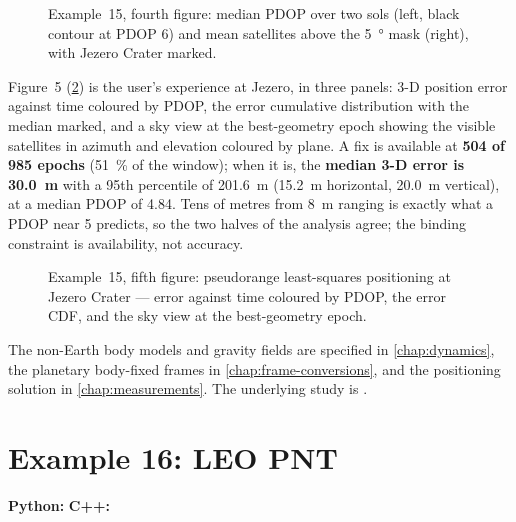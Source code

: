 \begin{figure}[htbp]
  \centering
  \caption{Example~15, fourth figure: median PDOP over two sols (left, black
           contour at PDOP 6) and mean satellites above the \SI{5}{\degree} mask
           (right), with Jezero Crater marked.}
  \label{fig:tut-ex15-pdop}
\end{figure}

Figure~5 (\cref{fig:tut-ex15-jezero}) is the user's experience at Jezero, in
three panels: 3-D position error against time coloured by PDOP, the error
cumulative distribution with the median marked, and a sky view at the
best-geometry epoch showing the visible satellites in azimuth and elevation
coloured by plane. A fix is available at \textbf{504 of 985 epochs}
(\SI{51}{\percent} of the window); when it is, the \textbf{median 3-D error is
\SI{30.0}{\meter}} with a 95th percentile of \SI{201.6}{\meter}
(\SI{15.2}{\meter} horizontal, \SI{20.0}{\meter} vertical), at a median PDOP of
4.84. Tens of metres from \SI{8}{\meter} ranging is exactly what a PDOP near 5
predicts, so the two halves of the analysis agree; the binding constraint is
availability, not accuracy.

\begin{figure}[htbp]
  \centering
  \caption{Example~15, fifth figure: pseudorange least-squares positioning at
           Jezero Crater --- error against time coloured by PDOP, the error CDF,
           and the sky view at the best-geometry epoch.}
  \label{fig:tut-ex15-jezero}
\end{figure}

The non-Earth body models and gravity fields are specified in
\cref{chap:dynamics}, the planetary body-fixed frames in
\cref{chap:frame-conversions}, and the positioning solution in
\cref{chap:measurements}. The underlying study is \citep{iiyama2025mars}.

\section{Example 16: LEO PNT}
\label{sec:tut-ex16}

\textbf{Python:}  \quad
\textbf{C++:} 

